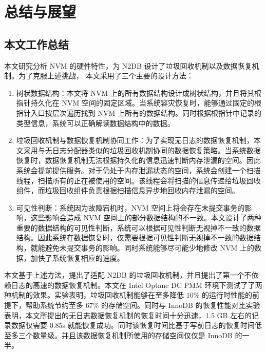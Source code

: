 
\chapter{总结与展望}

\section{本文工作总结}


本文研究分析 NVM 的硬件特性，为 N2DB 设计了垃圾回收机制以及数据恢复机制。为了克服上述挑战， 本文采用了三个主要的设计方法：

\begin{enumerate}
    \item 树状数据结构：本文将 NVM 上的所有数据结构设计成树状结构，并且将其根指针持久化在 NVM 空间的固定区域。当系统容灾恢复时，能够通过固定的根指针入口按层次遍历找到 NVM 上所有的数据结构。同时根据根指针中记录的类型信息，系统可以正确解读数据结构中的数据。
    \item 垃圾回收机制与数据恢复机制协同工作：为了实现无日志的数据恢复机制，本文采用与无日志分配器类似的垃圾回收机制协同的数据恢复策略。当系统数据恢复时，数据恢复机制无法根据持久化的信息迅速判断内存泄漏的空间。因此系统会提前提供服务。对于仍处于内存泄漏状态的空间，系统会创建一个扫描线程，扫描所有的正在被使用的空间。该线程会将扫描的信息传递给垃圾回收组件，而垃圾回收组件负责根据扫描信息异步地回收内存泄漏的空间。
    \item 可见性判断：系统因为故障宕机时，NVM 空间上将会存在未提交事务的影响，这些影响会造成 NVM 空间上的部分数据结构的不一致。本文设计了两种重要的数据结构的可见性判断，系统可以根据可见性判断无视掉不一致的数据结构。因此系统在数据恢复时，仅需要根据可见性判断无视掉不一致的数据结构，就能避免未提交事务的影响。同时系统能够尽可能少地修改 NVM 上的数据，加快了系统恢复相应的速度。
\end{enumerate}

本文基于上述方法，提出了适配 N2DB 的垃圾回收机制，并且提出了第一个不依赖日志的高速的数据恢复机制。本文在 Intel Optane DC PMM 环境下测试了了两种机制的效果。实验表明，垃圾回收机制能够在至多降低 $10\%$ 的运行时性能的前提下，帮助系统节约至多 $67\%$ 的存储空间。同时与 InnoDB 的恢复性能对比实验表明，本文所提出的无日志数据恢复机制的恢复时间十分迅速，1.5 GB 左右的记录数据仅需要 0.85s 就能恢复成功。同时该恢复时间比基于写前日志的恢复时间低至多三个数量级。并且该数据恢复机制所使用的存储空间仅仅是 InnoDB 的一半。

